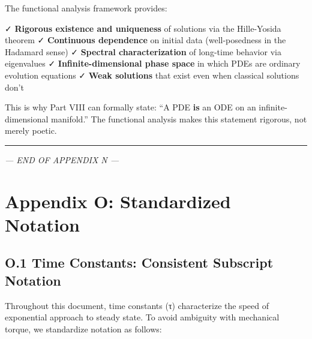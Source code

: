 \documentclass[
]{article}
\begin{document}
The functional analysis framework provides:

✓ \textbf{Rigorous existence and uniqueness} of solutions via the
Hille-Yosida theorem ✓ \textbf{Continuous dependence} on initial data
(well-posedness in the Hadamard sense) ✓ \textbf{Spectral
characterization} of long-time behavior via eigenvalues ✓
\textbf{Infinite-dimensional phase space} in which PDEs are ordinary
evolution equations ✓ \textbf{Weak solutions} that exist even when
classical solutions don't

This is why Part VIII can formally state: ``A PDE \textbf{is} an ODE on
an infinite-dimensional manifold.'' The functional analysis makes this
statement rigorous, not merely poetic.

\begin{center}\rule{0.5\linewidth}{0.5pt}\end{center}

\emph{--- END OF APPENDIX N ---}

\newpage

\section{Appendix O: Standardized
Notation}\label{appendix-o-standardized-notation}

\subsection{O.1 Time Constants: Consistent Subscript
Notation}\label{o.1-time-constants-consistent-subscript-notation}

Throughout this document, time constants (τ) characterize the speed of
exponential approach to steady state. To avoid ambiguity with mechanical
torque, we standardize notation as follows:
\end{document}
